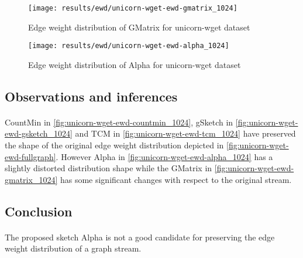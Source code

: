 \begin{figure}[H]
    \centering \texttt{[image: results/ewd/unicorn-wget-ewd-gmatrix\_1024]}
    \vspace{-0.5cm}
    \caption{Edge weight distribution of GMatrix for unicorn-wget dataset}
    \label{fig:unicorn-wget-ewd-gmatrix_1024}
\end{figure}

\begin{figure}[H]
    \centering \texttt{[image: results/ewd/unicorn-wget-ewd-alpha\_1024]}
    \vspace{-0.5cm}
    \caption{Edge weight distribution of Alpha for unicorn-wget dataset}
    \label{fig:unicorn-wget-ewd-alpha_1024}
\end{figure}

\subsection*{Observations and inferences}

\paragraph{}
CountMin in \autoref{fig:unicorn-wget-ewd-countmin_1024}, gSketch in \autoref{fig:unicorn-wget-ewd-gsketch_1024} and TCM in \autoref{fig:unicorn-wget-ewd-tcm_1024} have preserved the shape of the original edge weight distribution depicted in \autoref{fig:unicorn-wget-ewd-fullgraph}. However Alpha in \autoref{fig:unicorn-wget-ewd-alpha_1024} has a slightly distorted distribution shape while the GMatrix in \autoref{fig:unicorn-wget-ewd-gmatrix_1024} has some significant changes with respect to the original stream.

\subsection*{Conclusion}

\paragraph{}
The proposed sketch Alpha is not a good candidate for preserving the edge weight distribution of a graph stream.